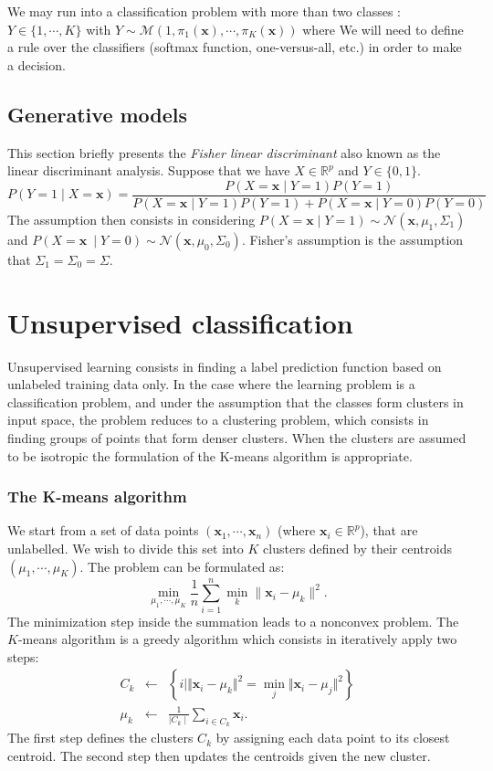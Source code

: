 \documentclass[12pt]{report}	%
\def\ts{\top}
\def\xb{\mathbf{x}}
\begin{document}
We may run into a classification problem with more than two classes : $Y \in \{1,\cdots ,K\}$ with $Y \sim  \mathcal{M}(1,\pi_{1}(\xb),\cdots,\pi_{K}(\xb))$ where
We will need to define a rule over the classifiers (softmax function, one-versus-all, etc.) in order to make a decision.

\subsection{Generative models}
This section briefly presents the \emph{Fisher linear discriminant} also known as the linear discriminant analysis. Suppose that we have $X\in \mathbb{R}^{p}$ and $Y \in \{0,1\}$.
$$P(Y=1 \mid X=\xb)=\dfrac{P(X=\xb \mid Y=1)P(Y=1)}{P(X=\xb \mid Y=1)P(Y=1) + P(X=\xb \mid Y=0)P(Y=0)}$$
The assumption then consists in considering $P(X=\xb \mid Y=1) \sim \mathcal{N}(\xb,\mu_1, \Sigma_{1}) $ and $P(X=\xb \ \mid Y=0)\sim\mathcal{N}(\xb,\mu_0, \Sigma_{0})$. Fisher's assumption is the assumption that $\Sigma_{1} = \Sigma_{0} = \Sigma$.


\section{Unsupervised classification}

Unsupervised learning consists in finding a label prediction function based on unlabeled training data only. In the case where the learning problem is a classification problem, and under the assumption that the classes form clusters in input space, the problem reduces to a clustering problem, which consists in finding groups of points that form denser clusters. 
When the clusters are assumed to be isotropic the formulation of the K-means algorithm is appropriate. 

\subsubsection{The K-means algorithm}

We start from a set of data points $(\xb_{1},\cdots,\xb_{n})$ (where $\xb_i \in \mathbb{R}^{p}$), that are unlabelled. We wish to divide this set into $K$ clusters defined by their centroids $(\mu_{1},\cdots,\mu_{K})$.
The problem can be formulated as:
$$\min_{\mu_{1},\cdots,\mu_{K}} \frac{1}{n} \sum_{i=1}^{n}\min_{k}\lVert \xb_i - \mu_k\rVert^{2}.$$
The minimization step inside the summation leads to a nonconvex problem. The $K$-means algorithm is a greedy algorithm which consists in iteratively apply two steps:
\begin{eqnarray*}
C_{k}& \leftarrow &\left\{ i\mid\Vert \xb_{i}-\mu_{k}\Vert^{2}=\min_{j}\Vert \xb_{i}-\mu_{j}\Vert^{2}\right\}\\
\mu_k &\leftarrow &\frac{1}{\mid C_k \mid}\sum_{i\in C_{k}}\xb_i.
\end{eqnarray*}
The first step defines the clusters $C_k$ by assigning each data point to its closest centroid. The second step then updates the centroids given the new cluster.\\
\end{document}
